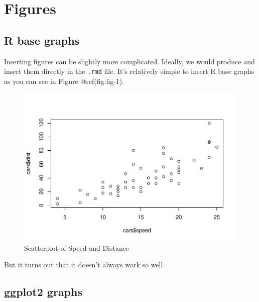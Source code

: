 \documentclass[
  12pt,
]{article}
\newenvironment{Shaded}{\begin{snugshade}}{\end{snugshade}}
\newcommand{\FunctionTok}[1]{\textcolor[rgb]{0.13,0.29,0.53}{\textbf{#1}}}
\newcommand{\NormalTok}[1]{#1}
\newcommand{\SpecialCharTok}[1]{\textcolor[rgb]{0.81,0.36,0.00}{\textbf{#1}}}
\begin{document}
\hypertarget{figures}{%
\section{Figures}\label{figures}}

\hypertarget{r-base-graphs}{%
\subsection{R base graphs}\label{r-base-graphs}}

Inserting figures can be slightly more complicated. Ideally, we would
produce and insert them directly in the \texttt{.rmd} file. It's
relatively simple to insert R base graphs as you can see in Figure
@ref(fig:fig-1).

\begin{Shaded}
\end{Shaded}

\begin{figure}[H]

{\centering \includegraphics{paper_files/figure-latex/fig-1-1} 

}

\caption{Scatterplot of Speed and Distance}\label{fig:fig-1}
\end{figure}

But it turns out that it doesn't always work so well.

\hypertarget{ggplot2-graphs}{%
\subsection{ggplot2 graphs}\label{ggplot2-graphs}}
\end{document}
